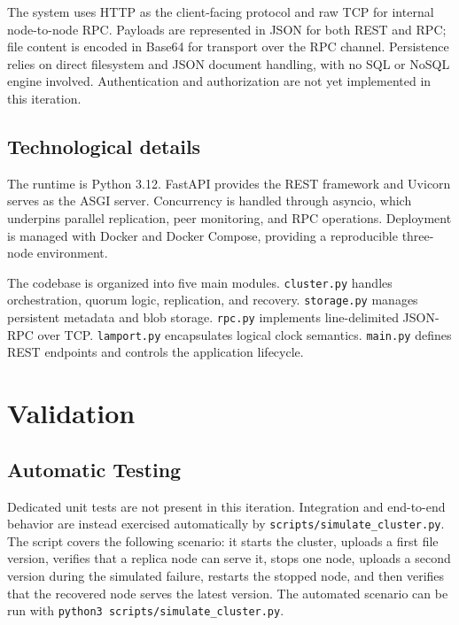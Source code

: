 \documentclass{scrartcl}
\begin{document}
The system uses HTTP as the client-facing protocol and raw TCP for internal node-to-node RPC. Payloads are represented in JSON for both REST and RPC; file content is encoded in Base64 for transport over the RPC channel. Persistence relies on direct filesystem and JSON document handling, with no SQL or NoSQL engine involved. Authentication and authorization are not yet implemented in this iteration.

\subsection{Technological details}\label{technological-details}

The runtime is Python 3.12. FastAPI provides the REST framework and Uvicorn serves as the ASGI server. Concurrency is handled through asyncio, which underpins parallel replication, peer monitoring, and RPC operations. Deployment is managed with Docker and Docker Compose, providing a reproducible three-node environment.

The codebase is organized into five main modules. \texttt{cluster.py} handles orchestration, quorum logic, replication, and recovery. \texttt{storage.py} manages persistent metadata and blob storage. \texttt{rpc.py} implements line-delimited JSON-RPC over TCP. \texttt{lamport.py} encapsulates logical clock semantics. \texttt{main.py} defines REST endpoints and controls the application lifecycle.

\section{Validation}\label{validation}

\subsection{Automatic Testing}\label{automatic-testing}

Dedicated unit tests are not present in this iteration. Integration and end-to-end behavior are instead exercised automatically by \texttt{scripts/simulate\_cluster.py}. The script covers the following scenario: it starts the cluster, uploads a first file version, verifies that a replica node can serve it, stops one node, uploads a second version during the simulated failure, restarts the stopped node, and then verifies that the recovered node serves the latest version. The automated scenario can be run with \texttt{python3 scripts/simulate\_cluster.py}.
\end{document}
